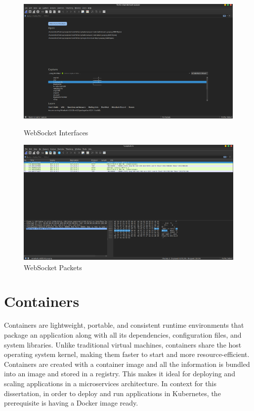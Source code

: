 \begin{figure}[H]
\centering
\begin{minipage}{0.9\textwidth}
  \centering
  \includegraphics[width=\textwidth]{SOA/ws_interfaces.png}
  \caption{WebSocket Interfaces}
\end{minipage}
\hfill
\begin{minipage}{0.9\textwidth}
  \centering
  \includegraphics[width=\textwidth]{SOA/ws_packet.png}
  \caption{WebSocket Packets}
\end{minipage}
\end{figure}



\section{Containers}
Containers are lightweight, portable, and consistent runtime environments that package an application along with all its dependencies, configuration files, and system libraries. Unlike traditional virtual machines, containers share the host operating system kernel, making them faster to start and more resource-efficient. Containers are created with a container image and all the information is bundled into an image and stored in a registry. This makes it ideal for deploying and scaling applications in a microservices architecture. In context for this dissertation, in order to deploy and run applications in Kubernetes, the prerequisite is having a Docker image ready.

